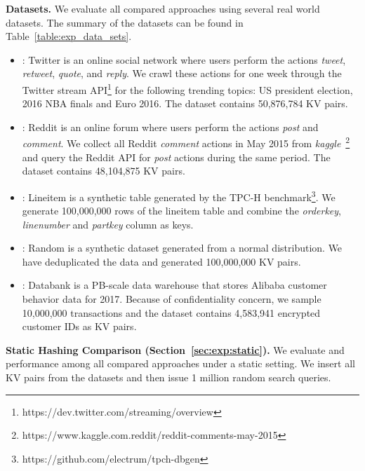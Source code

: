\vspace{1mm}\noindent\textbf{Datasets.} We evaluate all compared approaches using several real world datasets. The summary of the datasets can be found in Table~\ref{table:exp_data_sets}.
\begin{itemize}
	\item \dstwitter: Twitter is an online social network where users perform the actions \emph{tweet}, \emph{retweet}, \emph{quote}, and \emph{reply}.
	We crawl these actions for one week through the Twitter stream API\footnote{https://dev.twitter.com/streaming/overview} for the following trending topics: US president election, 2016 NBA finals and Euro 2016. The dataset contains 50,876,784 KV pairs.
	\item \dsreddit: Reddit is an online forum where users perform the actions \emph{post} and \emph{comment}. We collect all Reddit \emph{comment} actions in May 2015 from \emph{kaggle}~\footnote{https://www.kaggle.com.reddit/reddit-comments-may-2015} and query the Reddit API for \emph{post} actions during the same period. The dataset contains 48,104,875 KV pairs. 
 	\item \dstpch: Lineitem is a synthetic table generated by the TPC-H benchmark\footnote{https://github.com/electrum/tpch-dbgen}. We generate  100,000,000 rows of the lineitem table and combine the \emph{orderkey}, \emph{linenumber} and \emph{partkey} column as keys. 
	\item \dsrandom: Random is a synthetic dataset generated from a normal distribution. We have deduplicated the data and generated 100,000,000 KV pairs.  
	\item \dsali: Databank is a PB-scale data warehouse that stores Alibaba customer behavior data for 2017. Because of confidentiality concern, we sample 10,000,000 transactions and the dataset contains 4,583,941 encrypted customer IDs as KV pairs.
\end{itemize}






%



\vspace{1mm}\noindent\textbf{Static Hashing Comparison (Section~\ref{sec:exp:static}).}
We evaluate  and  performance among all compared approaches under a static setting. 
We insert all KV pairs from the datasets and then issue 1 million random search queries. 



